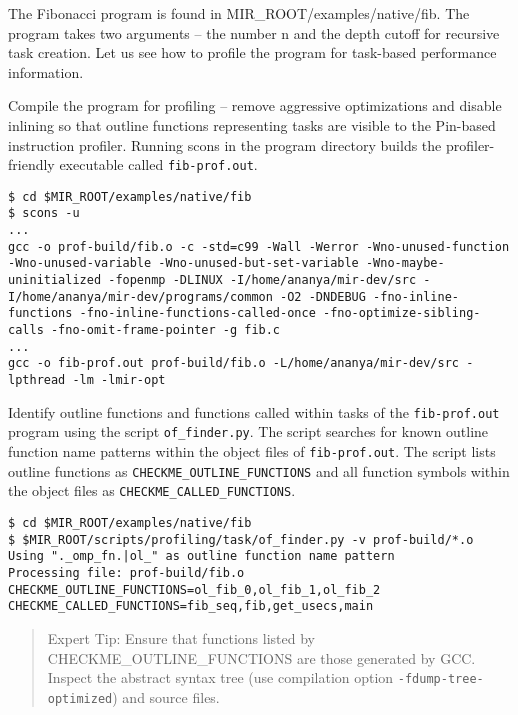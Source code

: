\documentclass[11pt,a4paper]{article}
\begin{document}
The Fibonacci program is found in MIR\_ROOT/examples/native/fib. The program takes two arguments -- the number n and the depth cutoff for recursive task creation. Let us see how to profile the program for task-based performance information.

Compile the program for profiling -- remove aggressive optimizations and disable inlining so that outline functions representing tasks are visible to the Pin-based instruction profiler. Running scons in the program directory builds the profiler-friendly executable called \texttt{fib-prof.out}.

\begin{lstlisting}[style=MyInputStyle]
$ cd $MIR_ROOT/examples/native/fib
$ scons -u
...
gcc -o prof-build/fib.o -c -std=c99 -Wall -Werror -Wno-unused-function -Wno-unused-variable -Wno-unused-but-set-variable -Wno-maybe-uninitialized -fopenmp -DLINUX -I/home/ananya/mir-dev/src -I/home/ananya/mir-dev/programs/common -O2 -DNDEBUG -fno-inline-functions -fno-inline-functions-called-once -fno-optimize-sibling-calls -fno-omit-frame-pointer -g fib.c
...
gcc -o fib-prof.out prof-build/fib.o -L/home/ananya/mir-dev/src -lpthread -lm -lmir-opt
\end{lstlisting}

Identify outline functions and functions called within tasks of the \texttt{fib-prof.out} program using the script \texttt{of\_finder.py}. The script searches for known outline function name patterns within the object files of \texttt{fib-prof.out}. The script lists outline functions as \texttt{CHECKME\_OUTLINE\_FUNCTIONS} and all function symbols within the object files as \texttt{CHECKME\_CALLED\_FUNCTIONS}.

\begin{lstlisting}[style=MyInputStyle]
$ cd $MIR_ROOT/examples/native/fib
$ $MIR_ROOT/scripts/profiling/task/of_finder.py -v prof-build/*.o
Using "._omp_fn.|ol_" as outline function name pattern
Processing file: prof-build/fib.o
CHECKME_OUTLINE_FUNCTIONS=ol_fib_0,ol_fib_1,ol_fib_2
CHECKME_CALLED_FUNCTIONS=fib_seq,fib,get_usecs,main
\end{lstlisting}

\begin{framed}
\begin{quote}
Expert Tip: Ensure that functions listed by CHECKME\_OUTLINE\_FUNCTIONS are those generated by GCC. Inspect the abstract syntax tree (use compilation option \texttt{-fdump-tree-optimized}) and source files.
\end{quote}
\end{framed}
\end{document}
